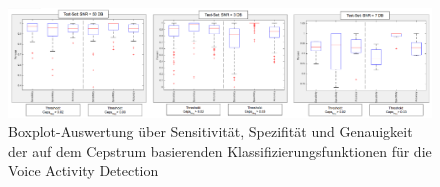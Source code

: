 \begin{appendices}
\begin{landscape}
 \begin{figure}[h]
	\centering
	\includegraphics[width=1.6\textwidth]{bilder/all_boxplots.png}
	\caption[Boxplots der Klassifizierungsfunktionen für die Voice Activity Detection]{Boxplot-Auswertung über Sensitivität, Spezifität und Genauigkeit der auf dem Cepstrum basierenden Klassifizierungsfunktionen für die Voice Activity Detection}
	\label{img:boxplots}
\end{figure}

\end{landscape}

\end{appendices}
